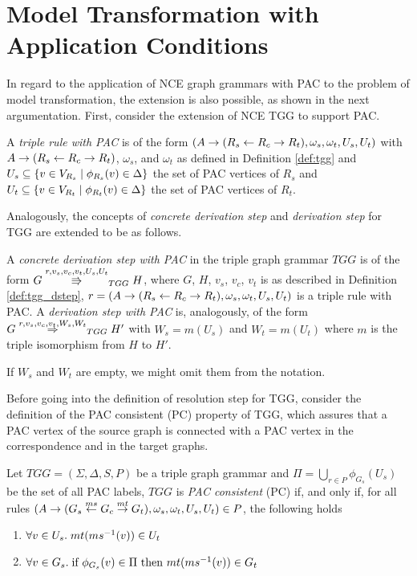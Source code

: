 \section{Model Transformation with Application Conditions}
In regard to the application of NCE graph grammars with PAC to the problem of model transformation, the extension is also possible, as shown in the next argumentation. First, consider the extension of NCE TGG to support PAC. 

\begin{definition}
	A \emph{triple rule with PAC} is of the form $(A \pro (R_s \ms{} R_c \mt{} R_t), \omega_s, \omega_t, U_s, U_t)$ with $A \pro (R_s \ms{} R_c \mt{} R_t)$, $\omega_s$, and $\omega_t$ as defined in Definition \ref{def:tgg} and $U_s \subseteq \{v \in V_{R_s} \st \phi_{R_s}(v) \in \Delta\}$ the set of PAC vertices of $R_s$ and $U_t \subseteq \{v \in V_{R_t} \st \phi_{R_t}(v) \in \Delta\}$ the set of PAC vertices of $R_t$.
\end{definition}

Analogously, the concepts of \textit{concrete derivation step} and \textit{derivation step} for TGG are extended to be as follows.

\begin{definition}
 A \textit{concrete derivation step with PAC} in the triple graph grammar $TGG$ is of the form $G \tcderivpac{r}{v_s,v_c,v_t}{U_s,U_t}{TGG} H$, where $G$, $H$, $v_s$, $v_c$, $v_t$ is as described in Definition \ref{def:tgg_dstep}, $r = (A \pro (R_s \ms{} R_c \mt{} R_t), \omega_s, \omega_t, U_s, U_t)$ is a triple rule with PAC. A \textit{derivation step with PAC} is, analogously, of the form $G \tderivpac{r}{v_s,v_c,v_t}{W_s,W_t}{TGG} H'$ with $W_s = m(U_s)$ and $W_t = m(U_t)$ where $m$ is the triple isomorphism from $H$ to $H'$.
\end{definition}

If $W_s$ and $W_t$ are empty, we might omit them from the notation.

Before going into the definition of resolution step for TGG, consider the definition of the PAC consistent (PC) property of TGG, which assures that a PAC vertex of the source graph is connected with a PAC vertex in the correspondence and in the target graphs.

\begin{definition}
	Let $TGG = (\Sigma, \Delta, S, P)$ be a triple graph grammar and $\Pi = \bigcup_{r \in P}{\phi_{G_s}(U_s)}$ be the set of all PAC labels, $TGG$ is \emph{PAC consistent} (PC) if, and only if, for all rules $(A \pro (G_s \ms{ms} G_c \mt{mt} G_t), \omega_s, \omega_t, U_s, U_t) \in P$, the following holds
	\begin{enumerate}
		\item $\forall v \in U_s \. mt(ms^{-1}(v)) \in U_t$
		\item $\forall v \in G_s \. \text{if } \phi_{G_s}(v) \in \Pi \text{ then } mt(ms^{-1}(v)) \in G_t$
	\end{enumerate}
\end{definition}

